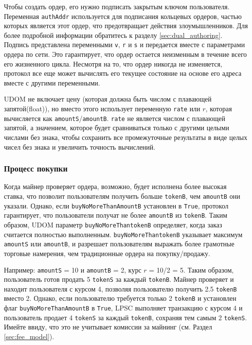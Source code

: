 \documentclass[utf8,nofonts]{article}
\begin{document}
\begin{multicols}{2}
	
	Чтобы создать ордер, его нужно подписать закрытым ключом пользователя. Переменная \verb|authAddr| используется для подписания кольцевых ордеров, частью которых является этот ордер, что предотвращает действия злоумышленников. Для более подробной информации обратитесь к разделу \ref{sec:dual_authoring}. Подпись представлена переменными \verb|v|, \verb|r| и \verb|s| и передается вместе с параметрами ордера по сети. Это гарантирует, что ордер остается неизменным в течение всего его жизненного цикла. Несмотря на то, что ордер никогда не изменяется, протокол все еще может вычислять его текущее состояние на основе его адреса вместе с другими переменными.
	
	
	
	UDOM не включает цену (которая должна быть числом с плавающей запятой(float)), но вместо этого использует переменную \verb|rate| или $r$, которая вычисляется как \verb|amountS|/\verb|amountB|. \verb|rate| не является числом с плавающей запятой, а значением, которое будет сравниваться только с другими целыми числами без знака, чтобы сохранить все промежуточные результаты в виде целых чисел без знака и увеличить точность вычислений. 
	
	\subsubsection{Процесс покупки}
	
	Когда майнер проверяет ордера, возможно, будет исполнена более высокая ставка, что позволит пользователям получить больше \verb|tokenB|, чем \verb|amountB| они указали. Однако, если \verb|buyNoMoreThanAmountB| установлен в \verb|True|, протокол гарантирует, что пользователи получат не более \verb|amountB| из \verb|tokenB|. Таким образом, UDOM параметр \verb|buyNoMoreThantokenB| определяет, когда заказ считается полностью выполненным. \verb|buyNoMoreThantokenB| указывает максимум \verb|amountS| или \verb|amountB|, и разрешает пользователям выражать более грамотные торговые намерения, чем традиционные ордера на покупку/продажу.
	
	Например: \verb|amountS| = 10 и \verb|amountB| = 2, курс $ r $ = 10/2 = 5. Таким образом, пользователь готов продать 5 \verb|tokenS| за каждый \verb|tokenB|. Майнер проверяет и находит пользователя с курсом 4, позволяя пользователю получить 2.5 \verb|tokenB| вместо 2. Однако, если пользователю требуется только 2 \verb|tokenB| и установлен флаг \verb|buyNoMoreThanAmountB| в \verb|True|, LPSC выполняет транзакцию с курсом 4 и пользователь продает 4 \verb|tokenS| за каждый \verb|tokenB|, сохраняя тем самым 2 \verb|tokenS|. Имейте ввиду, что это не учитывает комиссии за майнинг (см. Раздел \ref{sec:fee_model}).
	

\end{multicols}
\end{document}
